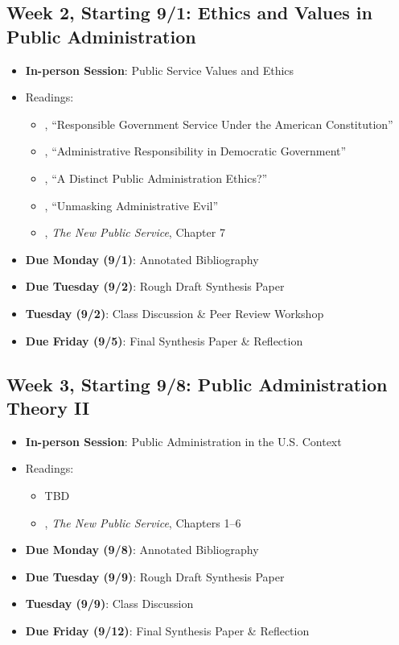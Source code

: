 \documentclass[12pt]{article}     %
\begin{document}
\subsection*{Week 2, Starting 9/1: Ethics and Values in Public Administration}
\begin{itemize}
    \item \textbf{In-person Session}: Public Service Values and Ethics
    \item Readings:
        \begin{itemize}
            \item \citet{friedrich1935}, ``Responsible Government Service Under the American Constitution'' 
            \item \citet{FINER1941}, ``Administrative Responsibility in Democratic Government'' 
            \item \citet{goss1996}, ``A Distinct Public Administration Ethics?'' 
            \item \citet{Adams2009}, ``Unmasking Administrative Evil'' 
            \item \citet{Denhardt2015}, \emph{The New Public Service}, Chapter 7 
        \end{itemize}
    \item \textbf{Due Monday (9/1)}: Annotated Bibliography
    \item \textbf{Due Tuesday (9/2)}: Rough Draft Synthesis Paper
    \item \textbf{Tuesday (9/2)}: Class Discussion  \& Peer Review Workshop
    \item \textbf{Due Friday (9/5)}: Final Synthesis Paper \& Reflection
\end{itemize}

\subsection*{Week 3, Starting 9/8: Public Administration Theory II}
\begin{itemize}
    \item \textbf{In-person Session}: Public Administration in the U.S. Context
    \item Readings:
        \begin{itemize}
            \item TBD
            \item \citet{Denhardt2015}, \emph{The New Public Service}, Chapters 1--6 
        \end{itemize}
    \item \textbf{Due Monday (9/8)}: Annotated Bibliography
    \item \textbf{Due Tuesday (9/9)}: Rough Draft Synthesis Paper
    \item \textbf{Tuesday (9/9)}: Class Discussion
    \item \textbf{Due Friday (9/12)}: Final Synthesis Paper \& Reflection
\end{itemize}
\end{document}
